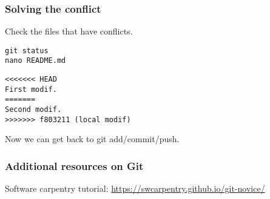 \documentclass{beamer}
\begin{document}
	\begin{frame}[fragile]
		\frametitle{Solving the conflict}
		
		Check the files that have conflicts.

		\begin{exampleblock}{}
		\begin{BVerbatim}
git status
nano README.md
		\end{BVerbatim}
		\end{exampleblock}{}

		\begin{exampleblock}{}
		\begin{tiny}
		\begin{BVerbatim}
<<<<<<< HEAD
First modif.
=======
Second modif.
>>>>>>> f803211 (local modif)

		\end{BVerbatim}
		\end{tiny}
		\end{exampleblock}{}

		Now we can get back to git add/commit/push.
	\end{frame}

	\begin{frame}
		\frametitle{Additional resources on Git}

		Software carpentry tutorial: \href{https://swcarpentry.github.io/git-novice/}{https://swcarpentry.github.io/git-novice/}
	\end{frame}
\end{document}
